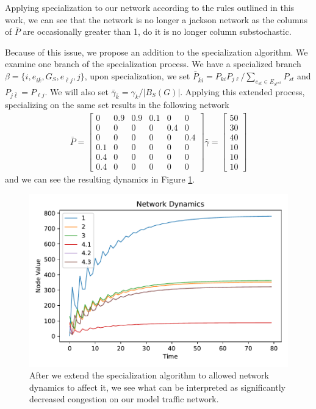 \documentclass[12pt]{thesis}
\begin{document}
Applying specialization to our network according to the rules outlined in this work, we can see that the network is no longer a jackson network as the columns of $\bar{P}$ are occasionally greater than 1, do it is no longer column substochastic.

Because of this issue, we propose an addition to the specialization algorithm.
We examine one branch of the specialization process. 
We have a specialized branch $\beta = \{i, e_{i\bar{k}}, G_S, e_{\bar{\ell}j}, j \}$, upon specialization, we set $\bar{P}_{\bar{k}i} = P_{ki}P_{j\ell}/\sum_{e_{st}\in E_{S^{\text{out}}}}P_{st}$ and $P_{j\bar{\ell}} = P_{\ell j}$.
We will also set $\bar{\gamma}_{\bar{k}} = \gamma_{k}/|B_S(G)|$.
Applying this extended process, specializing on the same set results in the following network
\begin{align*}
    \bar{P} = 
    \begin{bmatrix} 
          0  &  0.9  &  0.9  &  0.1  &    0  &    0 \\
          0  &    0  &    0  &    0  &  0.4  &    0 \\
          0  &    0  &    0  &    0  &    0  &  0.4 \\
        0.1  &    0  &    0  &    0  &    0  &    0 \\
        0.4  &    0  &    0  &    0  &    0  &    0 \\
        0.4  &    0  &    0  &    0  &    0  &    0 
    \end{bmatrix}
    \bar{\gamma} = \begin{bmatrix} 50 \\ 30 \\ 40 \\ 10 \\ 10 \\ 10 \end{bmatrix}
\end{align*}
and we can see the resulting dynamics in Figure \ref{fig:jackson_network_fixed}.

\begin{figure}
    \centering
    \includegraphics[width=.75\textwidth]{images/jackson_network_2_fixed.pdf}
    \caption{
        After we extend the specialization algorithm to allowed network dynamics to affect it, we see what can be interpreted as significantly decreased congestion on our model traffic network.
    }
    \label{fig:jackson_network_fixed}
\end{figure}
\end{document}
